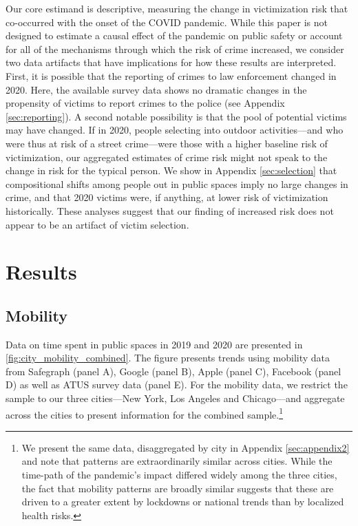 \documentclass[12pt]{article}
\begin{document}
Our core estimand is descriptive, measuring the change in victimization risk that co-occurred with the onset of the COVID pandemic. While this paper is not designed to estimate a causal effect of the pandemic on public safety or account for all of the mechanisms through which the risk of crime increased, we consider two data artifacts that have implications for how these results are interpreted. First, it is possible that the reporting of crimes to law enforcement changed in 2020. Here, the available survey data shows no dramatic changes in the propensity of victims to report crimes to the police (see Appendix \ref{sec:reporting}). A second notable possibility is that the pool of potential victims may have changed. If in 2020, people selecting into outdoor activities---and who were thus at risk of a street crime---were those with a higher baseline risk of victimization, our aggregated estimates of crime risk might not speak to the change in risk for the typical person. We show in Appendix \ref{sec:selection} that compositional shifts among people out in public spaces imply no large changes in crime, and that 2020 victims were, if anything, at lower risk of victimization historically. These analyses suggest that our finding of increased risk does not appear to be an artifact of victim selection.

\section{Results}
\subsection{Mobility}
Data on time spent in public spaces in 2019 and 2020 are presented in \autoref{fig:city_mobility_combined}. The figure presents trends using mobility data from Safegraph (panel A), Google (panel B), Apple (panel C), Facebook (panel D) as well as ATUS survey data (panel E). %
For the mobility data, we restrict the sample to our three cities---New York, Los Angeles and Chicago---and aggregate across the cities to present information for the combined sample.\footnote{We present the same data, disaggregated by city in Appendix \ref{sec:appendix2} and note that patterns are extraordinarily similar across cities. While the time-path of the pandemic's impact differed widely among the three cities, the fact that mobility patterns are broadly similar suggests that these are driven to a greater extent by lockdowns or national trends than by localized health risks. }
\end{document}
